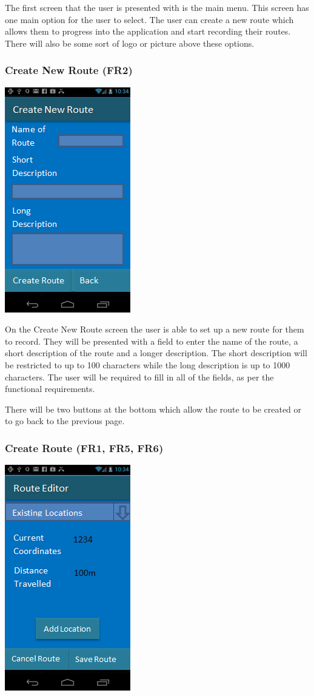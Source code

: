 \documentclass{project}
\begin{document}
The first screen that the user is presented with is the main menu. This screen has one main option for the user to select.
The user can create a new route which allows them to progress into the application and start recording their routes.
There will also be some sort of logo or picture above these options.

\subsubsection{Create New Route (FR2)}
\bigskip
\includegraphics{PhoneUI2}
\bigskip

On the Create New Route screen the user is able to set up a new route for them to record.
They will be presented with a field to enter the name of the route, a short description
of the route and a longer description. The short description will be restricted to up to 
100 characters while the long description is up to 1000 characters. The user will be 
required to fill in all of the fields, as per the functional requirements. 

\bigskip
There will be two buttons at the bottom which allow the route to be created or to go back to the previous page. 

\subsubsection{Create Route (FR1, FR5, FR6)}
\bigskip
\includegraphics{PhoneUI3}
\bigskip
\end{document}
